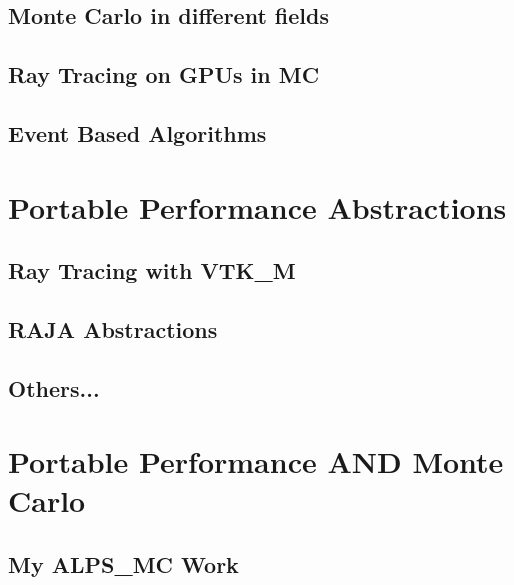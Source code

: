 	\subsection{Monte Carlo in different fields}
	\subsection{Ray Tracing on GPUs in MC}
	\subsection{Event Based Algorithms}
	
\section{Portable Performance Abstractions}
	\subsection{Ray Tracing with VTK_M}
	\subsection{RAJA Abstractions}
	\subsection{Others...}
	
\section{Portable Performance AND Monte Carlo}
	\subsection{My ALPS_MC Work}